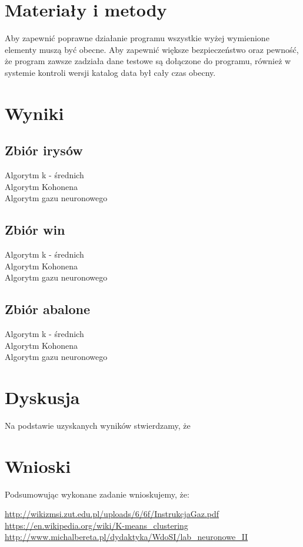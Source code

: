 \documentclass{classrep}
\begin{document}
\section{Materiały i metody}
{Aby zapewnić poprawne działanie programu wszystkie wyżej wymienione elementy muszą być obecne. Aby zapewnić większe bezpieczeństwo oraz pewność, że program zawsze zadziała dane testowe są dołączone do programu, również w systemie kontroli wersji katalog data był cały czas obecny. 
}

\section{Wyniki}
{
	\subsection{Zbiór irysów}
	{
		Algorytm k - średnich\\


		Algorytm Kohonena\\


		Algorytm gazu neuronowego\\
	}
	\subsection{Zbiór win}
	{
		Algorytm k - średnich\\


		Algorytm Kohonena\\


		Algorytm gazu neuronowego\\
	}
	\subsection{Zbiór abalone}
	{
		Algorytm k - średnich\\


		Algorytm Kohonena\\


		Algorytm gazu neuronowego\\
	}
}

\section{Dyskusja}
{
	Na podstawie uzyskanych wyników stwierdzamy, że
}

\section{Wnioski}
{
	Podsumowując wykonane zadanie wnioskujemy, że:\\
}

\begin{thebibliography}{0}
  \url{ http://wikizmsi.zut.edu.pl/uploads/6/6f/InstrukcjaGaz.pdf}
   \url{https://en.wikipedia.org/wiki/K-means\_clustering}
   \url{http://www.michalbereta.pl/dydaktyka/WdoSI/lab_neuronowe_II}
\end{thebibliography}

{

}
\end{document}
